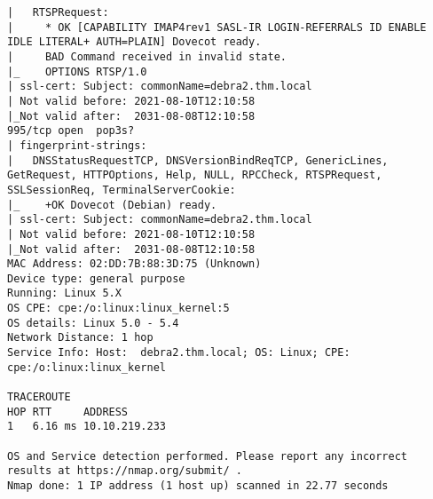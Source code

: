 \documentclass[11pt]{article}  %
\newenvironment{commandbox}[1][]{
  \begin{tcolorbox}[
      colback=kalibackground,
      colframe=commandcolor,
      fonttitle=\bfseries\color{white},
      title=#1,
      breakable=true
    ]
  }{
  \end{tcolorbox}
}
\begin{document}
\begin{commandbox}[Aggressive Scan]
\begin{lstlisting}[basicstyle=\normalsize\ttfamily\color{kalitext}]
|   RTSPRequest:
|     * OK [CAPABILITY IMAP4rev1 SASL-IR LOGIN-REFERRALS ID ENABLE IDLE LITERAL+ AUTH=PLAIN] Dovecot ready.
|     BAD Command received in invalid state.
|_    OPTIONS RTSP/1.0
| ssl-cert: Subject: commonName=debra2.thm.local
| Not valid before: 2021-08-10T12:10:58
|_Not valid after:  2031-08-08T12:10:58
995/tcp open  pop3s?
| fingerprint-strings:
|   DNSStatusRequestTCP, DNSVersionBindReqTCP, GenericLines, GetRequest, HTTPOptions, Help, NULL, RPCCheck, RTSPRequest, SSLSessionReq, TerminalServerCookie:
|_    +OK Dovecot (Debian) ready.
| ssl-cert: Subject: commonName=debra2.thm.local
| Not valid before: 2021-08-10T12:10:58
|_Not valid after:  2031-08-08T12:10:58
MAC Address: 02:DD:7B:88:3D:75 (Unknown)
Device type: general purpose
Running: Linux 5.X
OS CPE: cpe:/o:linux:linux_kernel:5
OS details: Linux 5.0 - 5.4
Network Distance: 1 hop
Service Info: Host:  debra2.thm.local; OS: Linux; CPE: cpe:/o:linux:linux_kernel

TRACEROUTE
HOP RTT     ADDRESS
1   6.16 ms 10.10.219.233

OS and Service detection performed. Please report any incorrect results at https://nmap.org/submit/ .
Nmap done: 1 IP address (1 host up) scanned in 22.77 seconds
\end{lstlisting}
\end{commandbox}
\end{document}
